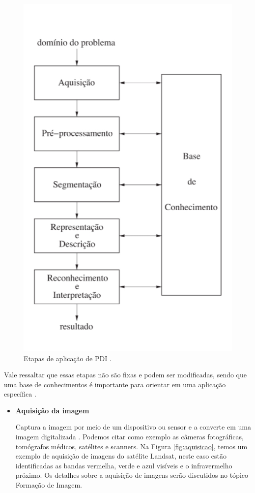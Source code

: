 \documentclass[
  brazilian,
]{book}
\begin{document}
\begin{figure}

{\centering \includegraphics[width=0.4\linewidth]{imagens/01-introducao/etapasPDI} 

}

\caption{Etapas de aplicação de PDI \autocite[p.~4]{pedrini2008}.}\label{fig:etapasPDI}
\end{figure}

Vale ressaltar que essas etapas não são fixas e podem ser modificadas, sendo que uma base de conhecimentos é importante para orientar em uma aplicação específica \autocite[p.~4]{pedrini2008}.

\begin{itemize}
\item
  \textbf{Aquisição da imagem}

  Captura a imagem por meio de um dispositivo ou sensor e a converte em uma imagem digitalizada \autocite[p.~3]{pedrini2008}. Podemos citar como exemplo as câmeras fotográficas, tomógrafos médicos, satélites e scanners. Na Figura \ref{fig:aquisicao}, temos um exemplo de aquisição de imagens do satélite Landsat, neste caso estão identificadas as bandas vermelha, verde e azul visíveis e o infravermelho próximo. Os detalhes sobre a aquisição de imagens serão discutidos no tópico Formação de Imagem.
\end{itemize}
\end{document}
